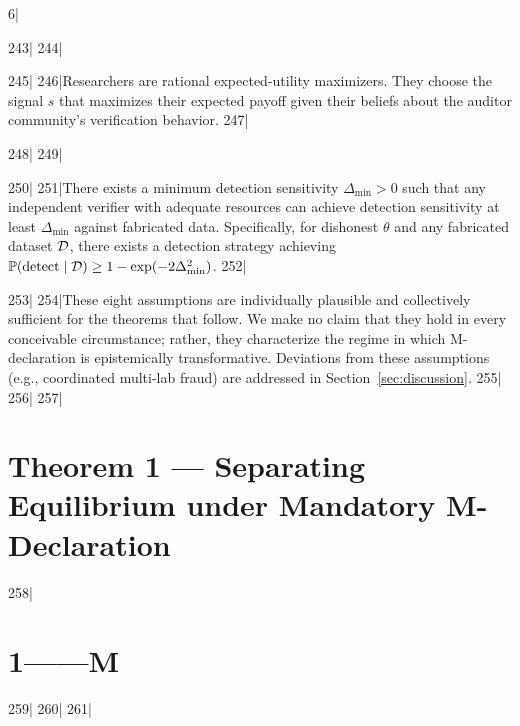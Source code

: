 6|\documentclass[12pt,a4paper]{article}
\begin{document}
243|
244|\begin{assumption}
245|\label{asm:rational}
246|Researchers are rational expected-utility maximizers. They choose the signal $s$ that maximizes their expected payoff given their beliefs about the auditor community's verification behavior.
247|\end{assumption}
248|
249|\begin{assumption}
250|\label{asm:auditor}
251|There exists a minimum detection sensitivity $\Delta_{\min} > 0$ such that any independent verifier with adequate resources can achieve detection sensitivity at least $\Delta_{\min}$ against fabricated data. Specifically, for dishonest $\theta$ and any fabricated dataset $\mathcal{D}$, there exists a detection strategy achieving $\mathbb{P}(\text{detect} \mid \mathcal{D}) \ge 1 - \exp(-2\Delta_{\min}^2)$.
252|\end{assumption}
253|
254|These eight assumptions are individually plausible and collectively sufficient for the theorems that follow. We make no claim that they hold in every conceivable circumstance; rather, they characterize the regime in which M-declaration is epistemically transformative. Deviations from these assumptions (e.g., coordinated multi-lab fraud) are addressed in Section~\ref{sec:discussion}.
255|
256|%
257|\section{Theorem 1 — Separating Equilibrium under Mandatory M-Declaration}
258|\section{1——M}
259|\label{sec:thm1}
260|%
261|
\end{document}
